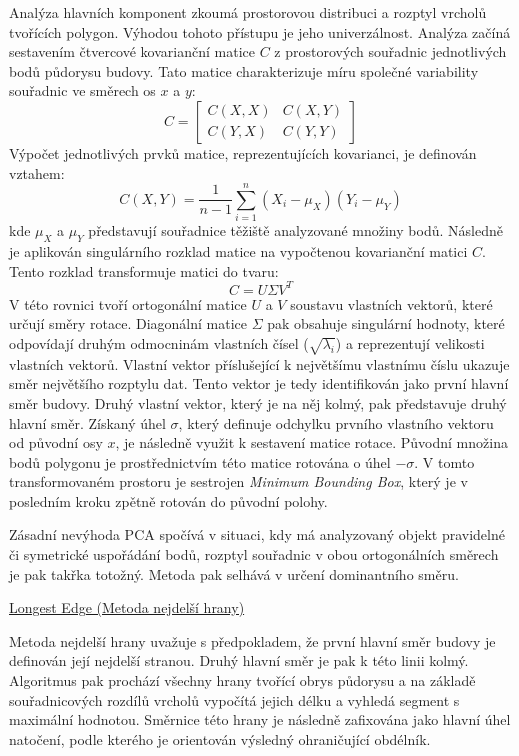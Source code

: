 \documentclass[12pt]{article}
\begin{document}
Analýza hlavních komponent zkoumá prostorovou distribuci a rozptyl vrcholů tvořících polygon. Výhodou tohoto přístupu je jeho univerzálnost. Analýza začíná sestavením čtvercové kovarianční matice ${C}$ z prostorových souřadnic jednotlivých bodů půdorysu budovy. Tato matice charakterizuje míru společné variability souřadnic ve směrech os $x$ a $y$:$$C = \begin{bmatrix} C(X,X) & C(X,Y) \\ C(Y,X) & C(Y,Y) \end{bmatrix}$$ Výpočet jednotlivých prvků matice, reprezentujících kovarianci, je definován vztahem: $$C(X,Y) = \frac{1}{n-1}\sum_{i=1}^{n}(X_i - \mu_X)(Y_i - \mu_Y)$$ kde $\mu_X$ a $\mu_Y$ představují souřadnice těžiště analyzované množiny bodů. Následně je aplikován singulárního rozklad matice na vypočtenou kovarianční matici $C$. Tento rozklad transformuje matici do tvaru:$$C = U \Sigma V^T$$ V této rovnici tvoří ortogonální matice $U$ a $V$ soustavu vlastních vektorů, které určují směry rotace. Diagonální matice $\Sigma$ pak obsahuje singulární hodnoty, které odpovídají druhým odmocninám vlastních čísel ($\sqrt{\lambda_i}$) a reprezentují velikosti vlastních vektorů. Vlastní vektor příslušející k největšímu vlastnímu číslu ukazuje směr největšího rozptylu dat. Tento vektor je tedy identifikován jako první hlavní směr budovy. Druhý vlastní vektor, který je na něj kolmý, pak představuje druhý hlavní směr. Získaný úhel $\sigma$, který definuje odchylku prvního vlastního vektoru od původní osy $x$, je následně využit k sestavení matice rotace. Původní množina bodů polygonu je prostřednictvím této matice rotována o úhel $-\sigma$. V tomto transformovaném prostoru je sestrojen \emph{Minimum Bounding Box}, který je v posledním kroku zpětně rotován do původní polohy. 

Zásadní nevýhoda PCA spočívá v situaci, kdy má analyzovaný objekt pravidelné či symetrické uspořádání bodů, rozptyl souřadnic v obou ortogonálních směrech je pak takřka totožný. Metoda pak selhává v určení dominantního směru.

\underline{Longest Edge (Metoda nejdelší hrany)}

Metoda nejdelší hrany uvažuje s předpokladem, že první hlavní směr budovy je definován její nejdelší stranou. Druhý hlavní směr je pak k této linii kolmý. Algoritmus pak prochází všechny hrany tvořící obrys půdorysu a na základě souřadnicových rozdílů vrcholů vypočítá jejich délku a vyhledá segment s maximální hodnotou. Směrnice této hrany je následně zafixována jako hlavní úhel natočení, podle kterého je orientován výsledný ohraničující obdélník.
\end{document}
